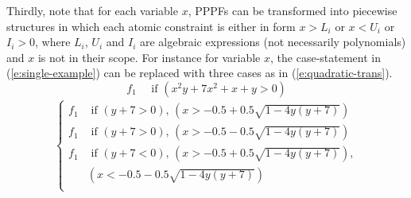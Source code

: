 \documentclass[letterpaper]{article}
\newcommand{\case}[2]{#2 &\text{ if } #1}%
\newcommand{\singlecase}[2]{#2 \quad \text{ if } #1}
\begin{document}
Thirdly, note that for each variable $x$, 
PPPFs can be transformed into piecewise structures 
in which each atomic constraint is either in form $x>L_i$ or $x<U_i$ or $I_i>0$, 
where $L_i$, $U_i$ and $I_i$ are 
algebraic expressions (not necessarily polynomials) and $x$ is not in their scope. 
For instance for variable $x$, the case-statement in (\ref{e:single-example})
can be replaced with three cases as in (\ref{e:quadratic-trans}).
{
\footnotesize
\begin{equation}
\label{e:single-example}
\singlecase{(x^2 y + 7x^2 + x + y > 0)}{f_1}
\end{equation}
\begin{align}
\label{e:quadratic-trans}
{
\begin{cases}
  \case{(y+7>0), \, (x> -0.5 + 0.5\sqrt{1 - 4y(y+7)}) }{f_1} \\ 
  \case{(y+7>0), \, (x> -0.5 - 0.5\sqrt{1 - 4y(y+7)}) }{f_1} \\ 
  \case{(y+7<0), \, (x > -0.5 + 0.5\sqrt{1 - 4y(y+7)}),\\
& (x < -0.5 - 0.5\sqrt{1 - 4y(y+7)}) }{f_1} \\ 
 \end{cases}
}
\end{align}
}
\end{document}
